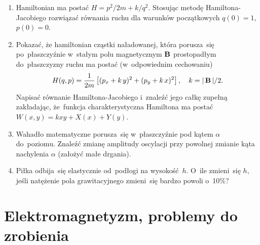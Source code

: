 \documentclass[a4paper,11pt]{article}
\begin{document}
\begin{enumerate}
\item Hamiltonian ma postać $H = p^{ 2 } / 2m + k / q^{ 2 }$. Stosując
  metodę Hamiltona-Jacobiego rozwiązać równania ruchu dla warunków
  początkowych $q( 0 ) = 1$, $p( 0 ) = 0$.



\item Pokazać, że hamiltonian cząstki naładowanej, która porusza~się
  po~płaszczyźnie w~stałym polu magnetycznym $\mathbf{B}$ prostopadłym
  do~płaszczyzny ruchu ma postać (w~odpowiednim cechowaniu)
  \begin{equation*}
    H( q, p ) =
    \frac{ 1 }{ 2m } \left[ ( p_{ x } + k \, y )^{ 2 }
      + ( p_{ y } + k \, x )^{ 2 } \right], \quad
    k = |\, {  \mathbf{B}  } \,| / 2.
  \end{equation*}
  Napisać równanie Hamiltona-Jacobiego i~znaleźć jego całkę zupełną
  zakładając, że~funkcja charakterystyczna Hamiltona ma postać
  $W( x, y ) = k x y + X( x ) + Y( y )$.



\item Wahadło matematyczne porusza~się w~płaszczyźnie pod kątem $\alpha$
  do~poziomu. Znaleźć zmianę amplitudy oscylacji przy powolnej zmianie
  kąta nachylenia $\alpha$ (założyć małe drgania).



\item Piłka odbija~się elastycznie od~podłogi na wysokość~$h$.
  O~ile zmieni~się $h$, jeśli natężenie pola grawitacyjnego zmieni~się
  bardzo powoli o~10\%?


\end{enumerate}










\section{Elektromagnetyzm, problemy do zrobienia}


\end{document}

